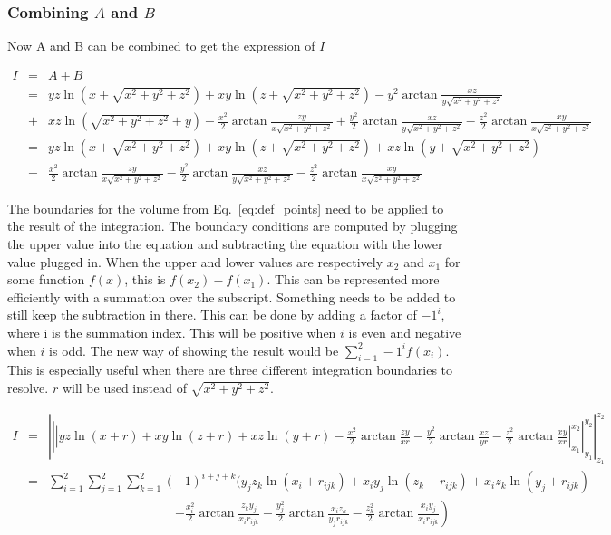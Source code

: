 \subsubsection{Combining $A$ and $B$}
Now A and B can be combined to get the expression of $I$ 

\begin{eqnarray}
I&=& A + B \nonumber\\
&=& yz \ln{\left( x + \sqrt{x^2+y^2+z^2} \right)} + 
xy \ln{\left( z + \sqrt{x^2+y^2+z^2} \right)} - 
y^2 \arctan{\frac{xz}{y\sqrt{x^2+y^2+z^2}}} \nonumber\\ 
&+& 
xz \ln{\left( \sqrt{x^2+y^2+z^2}+y \right)} - 
\frac{x^2}{2} \arctan{\frac{zy}{x\sqrt{x^2+y^2+z^2}}} + 
\frac{y^2}{2} \arctan{\frac{xz}{y\sqrt{x^2+y^2+z^2}}} - 
\frac{z^2}{2} \arctan{\frac{xy}{x\sqrt{z^2+y^2+z^2}}} \nonumber\\
&=&
yz \ln{\left( x + \sqrt{x^2+y^2+z^2} \right)} + 
xy \ln{\left( z + \sqrt{x^2+y^2+z^2} \right)} + 
xz \ln{\left( y+\sqrt{x^2+y^2+z^2} \right)} \nonumber\\ 
&-& 
\frac{x^2}{2} \arctan{\frac{zy}{x\sqrt{x^2+y^2+z^2}}} - 
\frac{y^2}{2} \arctan{\frac{xz}{y\sqrt{x^2+y^2+z^2}}} - 
\frac{z^2}{2} \arctan{\frac{xy}{x\sqrt{z^2+y^2+z^2}}} 
\end{eqnarray}

The boundaries for the volume from Eq.~\eqref{eq:def_points} need to be applied to the result of the integration. 
The boundary conditions are computed by plugging the upper value into the equation and subtracting the equation with the lower 
value plugged in. When the upper and lower values are respectively $x_2$ and $x_1$ for some function $f(x)$, this is $f(x_2) - f(x_1)$. 
This can be represented more efficiently with a summation over the subscript. Something needs to be added to still keep the subtraction in there. 
This can be done by adding a factor of $-1^i$, where i is the summation index. This will be positive when $i$ is even and negative when $i$ is odd. 
The new way of showing the result would be $\displaystyle\sum_{i=1}^{2} -1^i f(x_i)$. This is especially useful when there are three different 
integration boundaries to resolve. $r$ will be used instead of $\sqrt{x^2+y^2+z^2}$. 

\begin{eqnarray}
I
&=& \left| \left| \left| 
yz \ln{\left( x + r \right)} + 
xy \ln{\left( z + r \right)} + 
xz \ln{\left( y + r \right)} - 
\frac{x^2}{2} \arctan{\frac{zy}{xr}} - 
\frac{y^2}{2} \arctan{\frac{xz}{yr}} - 
\frac{z^2}{2} \arctan{\frac{xy}{xr}} 
\right|_{x_1}^{x_2} \right|_{y_1}^{y_2} \right|_{z_1}^{z_2} 
\nonumber\\
&=& \sum_{i=1}^{2} \sum_{j=1}^{2} \sum_{k=1}^{2} (-1)^{i+j+k} 
\Bigg(
y_j z_k \ln{\left( x_i + r_{ijk} \right)} + 
x_i y_j \ln{\left( z_k + r_{ijk} \right)} + 
x_i z_k \ln{\left( y_j+r_{ijk} \right)}  \nonumber\\
&& \qquad\qquad\qquad\qquad\qquad \left. - 
\frac{x_i^2}{2} \arctan{\frac{z_k y_j}{x_i r_{ijk}}} - 
\frac{y_j^2}{2} \arctan{\frac{x_i z_k}{y_j r_{ijk}}} - 
\frac{z_k ^2}{2} \arctan{\frac{x_i y_j}{x_i r_{ijk}}} 
\right)
\end{eqnarray} 

